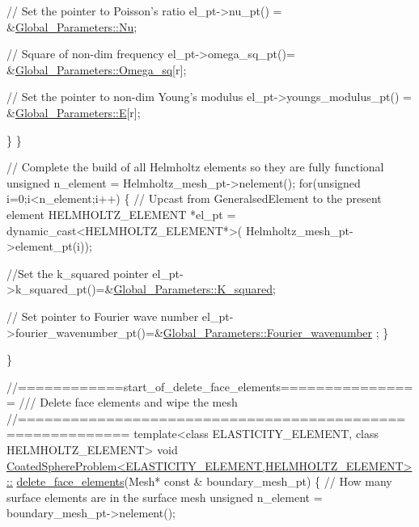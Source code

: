 \begin{DoxyCodeInclude}
{     \textcolor{comment}{// Set the pointer to Poisson's ratio}
     el\_pt->nu\_pt() = &\hyperlink{namespaceGlobal__Parameters_a373950a959cd784c8f8028099807c2fb}{Global\_Parameters::Nu};
      
     \textcolor{comment}{// Square of non-dim frequency}
     el\_pt->omega\_sq\_pt()= &\hyperlink{namespaceGlobal__Parameters_a91314f7f1cc80c43543948568f50f405}{Global\_Parameters::Omega\_sq}[r];

     \textcolor{comment}{// Set the pointer to non-dim Young's modulus}
     el\_pt->youngs\_modulus\_pt() = &\hyperlink{namespaceGlobal__Parameters_aa961bcca2115ce9cb37cc8ccb1b90cae}{Global\_Parameters::E}[r];

    \}
  \}    


 \textcolor{comment}{// Complete the build of all Helmholtz elements so they are fully functional}
 \textcolor{keywordtype}{unsigned} n\_element = Helmholtz\_mesh\_pt->nelement();
 \textcolor{keywordflow}{for}(\textcolor{keywordtype}{unsigned} i=0;i<n\_element;i++)
  \{
   \textcolor{comment}{// Upcast from GeneralsedElement to the present element}
   HELMHOLTZ\_ELEMENT *el\_pt = \textcolor{keyword}{dynamic\_cast<}HELMHOLTZ\_ELEMENT*\textcolor{keyword}{>}(
    Helmholtz\_mesh\_pt->element\_pt(i));
   
   \textcolor{comment}{//Set the k\_squared pointer}
   el\_pt->k\_squared\_pt()=&\hyperlink{namespaceGlobal__Parameters_a91a3fa265abaf9e724c668ee800ffb29}{Global\_Parameters::K\_squared};
   
   \textcolor{comment}{// Set pointer to Fourier wave number}
   el\_pt->fourier\_wavenumber\_pt()=&\hyperlink{namespaceGlobal__Parameters_ae1198385d90f52c4ed921520ae43a9e7}{Global\_Parameters::Fourier\_wavenumber}
      ;
  \}

\}



\textcolor{comment}{//============start\_of\_delete\_face\_elements================}\textcolor{comment}{}
\textcolor{comment}{/// Delete face elements and wipe the mesh}
\textcolor{comment}{}\textcolor{comment}{//==========================================================}
\textcolor{keyword}{template}<\textcolor{keyword}{class} ELASTICITY\_ELEMENT, \textcolor{keyword}{class} HELMHOLTZ\_ELEMENT>
\textcolor{keywordtype}{void} \hyperlink{classCoatedSphereProblem_a1092568f8c12afcefe7cbf56ebbb115c}{CoatedSphereProblem<ELASTICITY\_ELEMENT,HELMHOLTZ\_ELEMENT>::}
\hyperlink{classCoatedSphereProblem_a1092568f8c12afcefe7cbf56ebbb115c}{delete\_face\_elements}(Mesh* \textcolor{keyword}{const} & boundary\_mesh\_pt)
\{
 \textcolor{comment}{// How many surface elements are in the surface mesh}
 \textcolor{keywordtype}{unsigned} n\_element = boundary\_mesh\_pt->nelement();

}
\end{DoxyCodeInclude}
